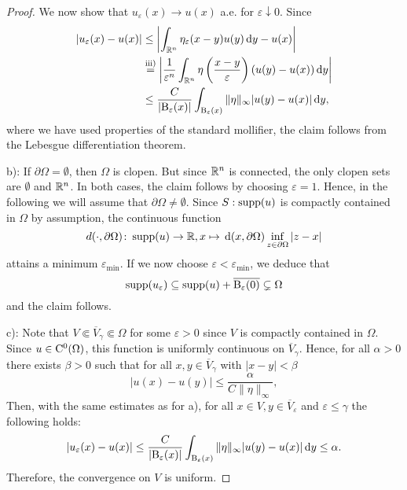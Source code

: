 \begin{enumerate}[i)]
\begin{proof}
    We now show that $u_\varepsilon(x) \to u(x)$ a.e. for $\varepsilon \downarrow 0$.
    Since
    \begin{align*}
    |u_\varepsilon(x) - u(x)|
    &\leq \left| \int_{\mathbb{R}^n} \eta_\varepsilon(x - y) u(y) \, {\operatorname{d}\!{y}} - u(x) \right| \\
    &\overset{\mathrm{iii)}}{=} \left| \frac{1}{\varepsilon^n} \int_{\mathbb{R}^n} \eta\left(\frac{x - y}{\varepsilon}\right) ( u(y) - u(x) ) \, {\operatorname{d}\!{y}} \right| \\
    &\leq \frac{C}{|\mathrm{B}_\varepsilon(x)|} \int_{\mathrm{B}_{\varepsilon}(x)} \|\eta\|_\infty |u(y) - u(x)| \, {\operatorname{d}\!{y}},
    \end{align*}
    where we have used properties of the standard mollifier, the claim follows from the Lebesgue differentiation theorem.

    b): If $\partial \Omega = \emptyset$, then $\Omega$ is clopen. 
    But since $\mathbb{R}^n$ is connected, the only clopen sets are $\emptyset$ and $\mathbb{R}^n$.
    In both cases, the claim follows by choosing $\varepsilon = 1$.
    Hence, in the following we will assume that $\partial \Omega \neq \emptyset$.
    Since $S: \operatorname{supp}(u)$ is compactly contained in $\Omega$ by assumption, the continuous function 
    $$d(\cdot,\partial\Omega) \colon \operatorname{supp}(u) \to \mathbb{R}, x \mapsto \, {\operatorname{d}\!{(}}x,\partial\Omega) \inf_{z \in \partial \Omega} |z - x|$$
    attains a minimum $\varepsilon_{\mathrm{min}}$. If we now choose $\varepsilon < \varepsilon_{\mathrm{min}}$, we deduce that
    $$
    \operatorname{supp}(u_\varepsilon) \subseteq \operatorname{supp}(u) + \overline{\mathrm{B}_\varepsilon(0)} \subsetneq \Omega
    $$
    and the claim follows.

    c): Note that $V \Subset \overline{V}_\gamma \Subset \Omega$ for some $\varepsilon > 0$ since $V$ is compactly contained in $\Omega$.
    Since $u \in \mathrm{C}^0(\Omega)$, this function is uniformly continuous on $\overline V_\gamma$. Hence, for all $\alpha > 0$ there exists $\beta > 0$ such that for all $x,y \in \overline V_\gamma$ with $|x - y| < \beta$
    $$
    |u(x) - u(y)| \leq \frac{\alpha}{C \|\eta\|_\infty},
    $$
    Then, with the same estimates as for a), for all $x \in V, y \in \overline{V}_\varepsilon$ and $\varepsilon \leq \gamma$ the following holds:
    $$
    |u_\varepsilon(x) - u(x)|
    \leq \frac{C}{|\mathrm{B}_\varepsilon(x)|} \int_{\mathrm{B}_{\varepsilon}(x)} \|\eta\|_\infty |u(y) - u(x)| \, {\operatorname{d}\!{y}} \leq  \alpha.
    $$
    Therefore, the convergence on $V$ is uniform.


\end{proof}
\end{enumerate}
